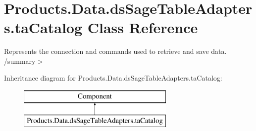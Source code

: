\hypertarget{class_products_1_1_data_1_1ds_sage_table_adapters_1_1ta_catalog}{}\section{Products.\+Data.\+ds\+Sage\+Table\+Adapters.\+ta\+Catalog Class Reference}
\label{class_products_1_1_data_1_1ds_sage_table_adapters_1_1ta_catalog}


Represents the connection and commands used to retrieve and save data. /summary$>$  


Inheritance diagram for Products.\+Data.\+ds\+Sage\+Table\+Adapters.\+ta\+Catalog\+:\begin{figure}[H]
\begin{center}
\leavevmode
\includegraphics[height=2.000000cm]{class_products_1_1_data_1_1ds_sage_table_adapters_1_1ta_catalog}
\end{center}
\end{figure}
